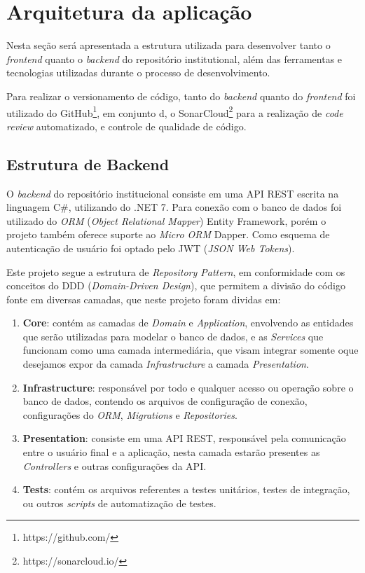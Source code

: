 \section{Arquitetura da aplicação}

Nesta seção será apresentada a estrutura utilizada para desenvolver tanto o
\emph{frontend} quanto o \emph{backend} do repositório institutional, além das
ferramentas e tecnologias utilizadas durante o processo de desenvolvimento.

Para realizar o versionamento de código, tanto do \emph{backend} quanto do
\emph{frontend} foi utilizado do GitHub\footnote{https://github.com/}, em
conjunto d, o SonarCloud\footnote{https://sonarcloud.io/} para a realização
de \emph{code review} automatizado, e controle de qualidade de código.

\subsection{Estrutura de Backend}

O \emph{backend} do repositório institucional consiste em uma API REST escrita na
linguagem C\#, utilizando do .NET 7. Para conexão com o banco de dados foi utilizado
do \emph{ORM} (\emph{Object Relational Mapper}) Entity Framework, porém o projeto
também oferece suporte ao \emph{Micro ORM} Dapper. Como esquema de autenticação
de usuário foi optado pelo JWT (\emph{JSON Web Tokens}).

Este projeto segue a estrutura de \emph{Repository Pattern}, em conformidade com os
conceitos do DDD (\emph{Domain-Driven Design}), que permitem a divisão do código
fonte em diversas camadas, que neste projeto foram dividas em:

\begin{enumerate}
    \item \textbf{Core}: contém as camadas de \emph{Domain} e \emph{Application},
          envolvendo as entidades que serão utilizadas para modelar o banco de dados,
          e as \emph{Services} que funcionam como uma camada intermediária, que visam
          integrar somente oque desejamos expor da camada \emph{Infrastructure} a
          camada \emph{Presentation}.

    \item \textbf{Infrastructure}: responsável por todo e qualquer acesso ou operação
          sobre o banco de dados, contendo os arquivos de configuração de conexão,
          configurações do \emph{ORM}, \emph{Migrations} e \emph{Repositories}.

    \item \textbf{Presentation}: consiste em uma API REST, responsável pela comunicação
          entre o usuário final e a aplicação, nesta camada estarão presentes as
          \emph{Controllers} e outras configurações da API.

    \item \textbf{Tests}: contém os arquivos referentes a testes unitários, testes de
          integração, ou outros \emph{scripts} de automatização de testes.
\end{enumerate}

